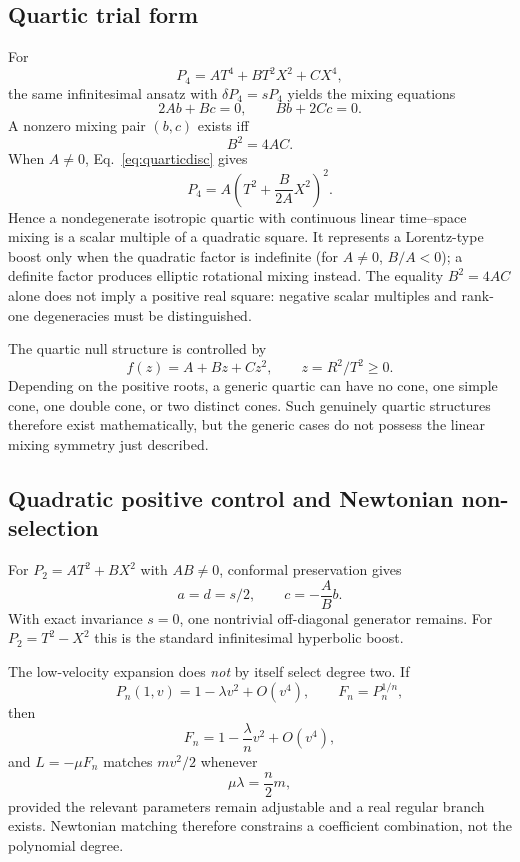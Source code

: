 \documentclass[11pt,a4paper]{article}
\begin{document}
\subsection{Quartic trial form}
For
\begin{equation}
P_4=AT^4+BT^2X^2+CX^4,
\end{equation}
the same infinitesimal ansatz with $\delta P_4=sP_4$ yields the mixing equations
\begin{equation}
2Ab+Bc=0,
\qquad
Bb+2Cc=0.
\end{equation}
A nonzero mixing pair $(b,c)$ exists iff
\begin{equation}
\boxed{B^2=4AC}.
\label{eq:quarticdisc}
\end{equation}
When $A\neq0$, Eq.~\eqref{eq:quarticdisc} gives
\begin{equation}
\boxed{P_4=A\left(T^2+\frac{B}{2A}X^2\right)^2}.
\label{eq:quarticsquare}
\end{equation}
Hence a nondegenerate isotropic quartic with continuous linear time--space mixing is a scalar multiple of a quadratic square.  It represents a Lorentz-type boost only when the quadratic factor is indefinite (for $A\neq0$, $B/A<0$); a definite factor produces elliptic rotational mixing instead.  The equality $B^2=4AC$ alone does not imply a positive real square: negative scalar multiples and rank-one degeneracies must be distinguished.

The quartic null structure is controlled by
\begin{equation}
f(z)=A+Bz+Cz^2,
\qquad z=R^2/T^2\ge0.
\end{equation}
Depending on the positive roots, a generic quartic can have no cone, one simple cone, one double cone, or two distinct cones.  Such genuinely quartic structures therefore exist mathematically, but the generic cases do not possess the linear mixing symmetry just described.

\subsection{Quadratic positive control and Newtonian non-selection}
For $P_2=AT^2+BX^2$ with $AB\neq0$, conformal preservation gives
\begin{equation}
a=d=s/2,
\qquad
c=-\frac AB b.
\end{equation}
With exact invariance $s=0$, one nontrivial off-diagonal generator remains.  For $P_2=T^2-X^2$ this is the standard infinitesimal hyperbolic boost.

The low-velocity expansion does \emph{not} by itself select degree two.  If
\begin{equation}
P_n(1,v)=1-\lambda v^2+O(v^4),
\qquad F_n=P_n^{1/n},
\end{equation}
then
\begin{equation}
F_n=1-\frac{\lambda}{n}v^2+O(v^4),
\end{equation}
and $L=-\mu F_n$ matches $mv^2/2$ whenever
\begin{equation}
\mu\lambda=\frac n2m,
\end{equation}
provided the relevant parameters remain adjustable and a real regular branch exists.  Newtonian matching therefore constrains a coefficient combination, not the polynomial degree.
\end{document}
